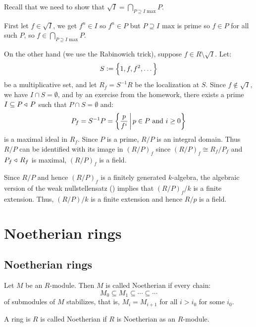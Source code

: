 \documentclass[11pt,a4paper]{article}
\begin{document}
\begin{proofof}{}
  Recall that we need to show that
  $\sqrt{I} = \bigcap_{P \supseteq I \text{ max}} P$.

  First let $f \in \sqrt{I}$, we get $f^n \in I$
  so $f^n \in P$ but $P \supseteq I \text{ max}$
  is prime so $f \in P$ for all such $P$,
  so $f \in \bigcap_{P \supseteq I \text{ max}} P$.

  On the other hand (we use the Rabinowich trick),
  suppose $f \in R \setminus \sqrt{I}$.
  Let:
  \[
    S := \left\{1,f,f^2,\dots\right\}
  \]
  be a multiplicative set,
  and let $R_{f} = S^{-1}R$ be the localization at $S$.
  Since $f \notin \sqrt{I}$, we have $I \cap S = \emptyset$,
  and by an exercise from the homework,
  there exists a prime $I \subseteq P \triangleleft\, P$ such
  that $P \cap S = \emptyset$
  and:
  \[
    P_f = S^{-1} P = \left\{\frac{p}{f^i} \,\middle\vert\, p \in P \text{ and } i \geq 0\right\}
  \]
  is a maximal ideal in $R_f$.
  Since $P$ is a prime, $R/P$ is an integral domain.
  Thus $R/P$ can be identified with its image in $(R/P)_f$
  since $(R/P)_f \cong R_f/P_f$ and $P_f \triangleleft\, R_f$
  is maximal, $(R/P)_f$ is a field.

  Since $R/P$ and hence $(R/P)_f$ is a finitely generated $k$-algebra,
  the algebraic version of the weak nullstellensatz
  ()
  implies that $(R/P)_f/k$ is a finite extension.
  Thus, $(R/P)/k$ is a finite extension and hence $R/p$
  is a field.
\end{proofof}

\newpage

\section{Noetherian rings}
\subsection{Noetherian rings}

\begin{definition}
  Let $M$ be an $R$-module.
  Then $M$ is called Noetherian if every chain:
  \[
    M_0 \subseteq M_1 \subseteq \cdots \subseteq \cdots
  \]
  of submodules of $M$ stabilizes,
  that is, $M_i = M_{i+1}$ for all $i > i_0$
  for some $i_0$.
\end{definition}

\begin{definition}
  A ring is $R$ is called Noetherian if $R$ is Noetherian
  as an $R$-module.
\end{definition}
\end{document}
